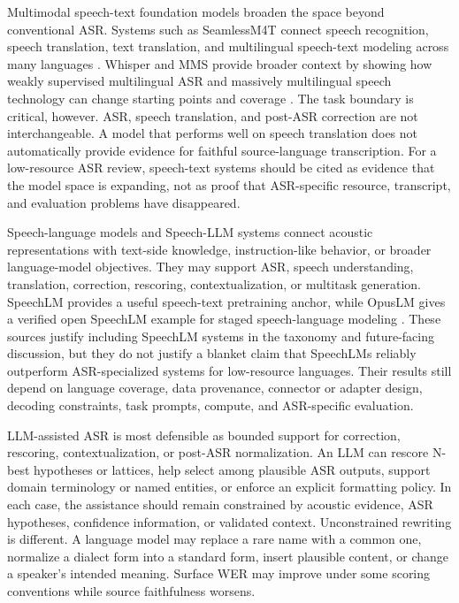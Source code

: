 \documentclass[pdflatex,sn-basic,iicol]{sn-jnl}
\theoremstyle{thmstyleone}
\theoremstyle{thmstyletwo}
\theoremstyle{thmstylethree}
\begin{document}
Multimodal speech-text foundation models broaden the space beyond conventional ASR. Systems such as SeamlessM4T connect speech recognition, speech translation, text translation, and multilingual speech-text modeling across many languages \citep{seamless2025_joint_speech_text_mt}. Whisper and MMS provide broader context by showing how weakly supervised multilingual ASR and massively multilingual speech technology can change starting points and coverage \citep{pmlr-v202-radford23a,pratap2024mms}. The task boundary is critical, however. ASR, speech translation, and post-ASR correction are not interchangeable. A model that performs well on speech translation does not automatically provide evidence for faithful source-language transcription. For a low-resource ASR review, speech-text systems should be cited as evidence that the model space is expanding, not as proof that ASR-specific resource, transcript, and evaluation problems have disappeared.

Speech-language models and Speech-LLM systems connect acoustic representations with text-side knowledge, instruction-like behavior, or broader language-model objectives. They may support ASR, speech understanding, translation, correction, rescoring, contextualization, or multitask generation. SpeechLM provides a useful speech-text pretraining anchor, while OpusLM gives a verified open SpeechLM example for staged speech-language modeling \citep{zhang2024_speechlm,tian25b_interspeech}. These sources justify including SpeechLM systems in the taxonomy and future-facing discussion, but they do not justify a blanket claim that SpeechLMs reliably outperform ASR-specialized systems for low-resource languages. Their results still depend on language coverage, data provenance, connector or adapter design, decoding constraints, task prompts, compute, and ASR-specific evaluation.

LLM-assisted ASR is most defensible as bounded support for correction, rescoring, contextualization, or post-ASR normalization. An LLM can rescore N-best hypotheses or lattices, help select among plausible ASR outputs, support domain terminology or named entities, or enforce an explicit formatting policy. In each case, the assistance should remain constrained by acoustic evidence, ASR hypotheses, confidence information, or validated context. Unconstrained rewriting is different. A language model may replace a rare name with a common one, normalize a dialect form into a standard form, insert plausible content, or change a speaker's intended meaning. Surface WER may improve under some scoring conventions while source faithfulness worsens.
\end{document}
